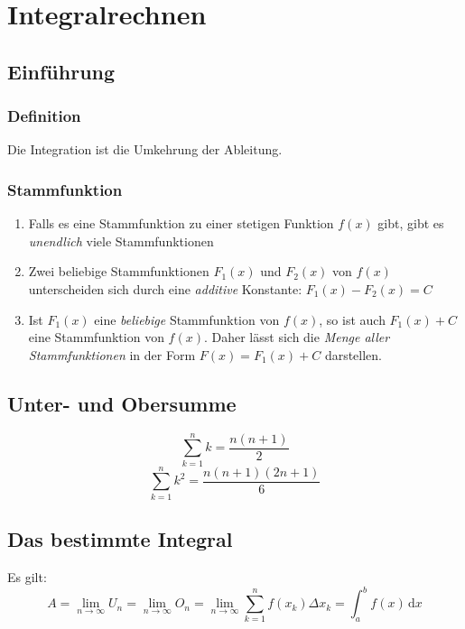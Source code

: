 \chapter{Integralrechnen}
\section{Einführung} %
\label{sec:einführung}

\subsection{Definition} %
\label{sub:definition}
Die Integration ist die Umkehrung der Ableitung.
\subsection{Stammfunktion} %
\begin{enumerate}
	\item Falls es eine Stammfunktion zu einer stetigen Funktion \(f(x)\) gibt, gibt es \emph{unendlich} viele Stammfunktionen
	\item Zwei beliebige Stammfunktionen \(F_1 (x)\) und \(F_2 (x)\) von \(f(x)\) unterscheiden sich durch eine \emph{additive} Konstante: \(F_1 (x) - F_2 (x) = C\)
	\item Ist \(F_1 (x)\) eine \emph{beliebige} Stammfunktion von \(f (x)\), so ist auch \(F_1 (x) + C\) eine Stammfunktion von \(f (x)\). Daher lässt sich die \emph{Menge aller Stammfunktionen} in der Form \(F(x) = F_1 (x) + C \) darstellen.
\end{enumerate}

\section{Unter- und Obersumme}
\[ \sum_{k=1}^{n} k = \frac{n(n+1)}{2} \]
\[ \sum_{k=1}^{n} k^2 = \frac{n(n+1)(2n+1)}{6} \]

\section{Das bestimmte Integral} %
\label{sub:das_bestimmte_integral}
Es gilt:\newline
\[A = \lim\limits_{n \rightarrow \infty}U_n = \lim\limits_{n \rightarrow \infty}O_n = \lim\limits_{n \rightarrow \infty}\sum_{k=1}^{n} f(x_k) \Delta x_k = \int_a^b f(x)\,\mathrm{d}x \]

